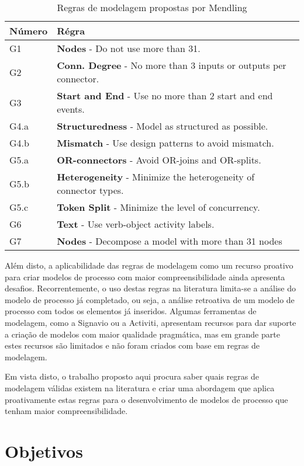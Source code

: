 \documentclass[12pt]{article}
\begin{document}
	\begin{table}
		\begin{tabularx}{\textwidth}{l X}\label{7PMG}
			Número & Régra\\\hline
			G1 & \textbf{Nodes} - Do not use more than 31.\\
			G2 & \textbf{Conn. Degree} - No more than 3 inputs or outputs per connector.\\
			G3 & \textbf{Start and End} - Use no more than 2 start and end events.\\
			G4.a & \textbf{Structuredness} - Model as structured as possible.\\
			G4.b & \textbf{Mismatch} - Use design patterns to avoid mismatch.\\
			G5.a & \textbf{OR-connectors} - Avoid OR-joins and OR-splits.\\
			G5.b & \textbf{Heterogeneity} - Minimize the heterogeneity of connector types.\\
			G5.c & \textbf{Token Split} - Minimize the level of concurrency.\\
			G6 & \textbf{Text} - Use verb-object activity labels.\\
			G7 & \textbf{Nodes} - Decompose a model with more than 31 nodes\\
		\end{tabularx}
		\caption{Regras de modelagem propostas por Mendling \cite{Mendling2013}}
	\end{table}


Além disto, a aplicabilidade das regras de modelagem como um recurso proativo para criar modelos de processo com maior compreensibilidade ainda apresenta desafios. Recorrentemente, o uso destas regras na literatura limita-se a análise do modelo de processo já completado, ou seja, a análise retroativa de um modelo de processo com todos os elementos já inseridos. Algumas ferramentas de modelagem, como a Signavio ou a Activiti, apresentam recursos para dar suporte a criação de modelos com maior qualidade pragmática, mas em grande parte estes recursos são limitados e não foram criados com base em regras de modelagem.

Em vista disto, o trabalho proposto aqui procura saber quais regras de modelagem válidas existem na literatura e criar uma abordagem que aplica proativamente estas regras para o desenvolvimento de modelos de processo que tenham maior compreensibilidade.

\section{Objetivos}
\end{document}
